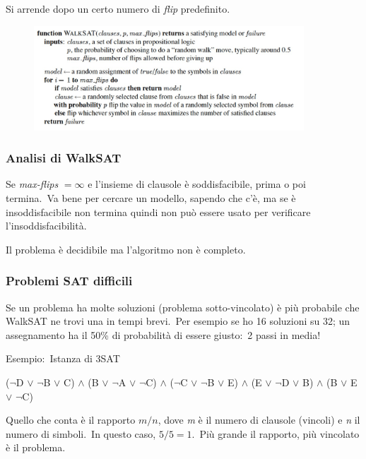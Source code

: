 Si arrende dopo un certo numero di \textit{flip} predefinito.

\begin{figure}[H]
	\centering
	\includegraphics[width=0.9\textwidth]{immagini/WalkSAT.jpg}
\end{figure}

\subsubsection{Analisi di WalkSAT}

Se \textit{max-flips} $= \infty$ e l'insieme di clausole è soddisfacibile, prima o poi termina.\
Va bene per cercare un modello, sapendo che c'è, ma se è insoddisfacibile non termina quindi non può essere usato per verificare l'insoddisfacibilità.\

Il problema è decidibile ma l'algoritmo non è completo.

\subsubsection{Problemi SAT difficili}

Se un problema ha molte soluzioni (problema sotto-vincolato) è più probabile che WalkSAT ne trovi una in tempi brevi.\
Per esempio se ho 16 soluzioni su 32; un assegnamento ha il 50\% di probabilità di essere giusto:\ 2 passi in media!

\noindent Esempio:\ Istanza di 3SAT

\begin{center}
	($\lnot$D $\lor$ $\lnot$B $\lor$ C) $\land$ (B $\lor$ $\lnot$A $\lor$ $\lnot$C) $\land$ ($\lnot$C $\lor$ $\lnot$B $\lor$ E) $\land$ (E $\lor$ $\lnot$D $\lor$ B) $\land$ (B $\lor$ E $\lor$ $\lnot$C)
\end{center}

\noindent Quello che conta è il rapporto $m/n$, dove \textit{m} è il numero di clausole (vincoli) e \textit{n} il numero di simboli.\
In questo caso, $5/5=1$.\
Più grande il rapporto, più vincolato è il problema.\

